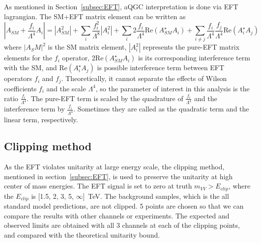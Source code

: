 As mentioned in Section~\ref{subsec:EFT}, aQGC interpretation is done via EFT lagrangian. 
The SM+EFT matrix element can be written as
\begin{equation}
   |A_{SM}+\frac{f_i}{\Lambda^4}A_i|=|A_{SM}^2|+\sum\limits_i \frac{f_i^2}{\Lambda^8}|A_{i}^2|+ \sum\limits_i 2 \frac{f_i}{\Lambda^4} \mathrm{Re}(A_{SM}^\star A_i) +\sum\limits_{i\neq j} \frac{f_i}{\Lambda^4} \frac{f_j}{\Lambda^4} \mathrm{Re}(A_i^\star A_j)
\end{equation}
where $|A_SM|^2$ is the SM matrix element, $|A_{i}^2|$ represents the pure-EFT matrix elements for the $f_{i}$ operator, $2 \mathrm{Re}(A_{SM}^\star A_i)$ is its corresponding interference term with the SM, and $\mathrm{Re}(A_i^\star A_j)$ is possible interference term between EFT operators $f_{i}$ and $f_{j}$. 
Theoretically, it cannot separate the effects of Wilson coefficients $f_i$ and the scale $\Lambda^4$, so the parameter of interest in this analysis is the ratio $\frac{f_i}{\Lambda^4}$. %
The pure-EFT term is scaled by the quadrature of $\frac{f_i}{\Lambda^4}$ and the interference term by $\frac{f_{i}}{\Lambda^4}$.
Sometimes they are called as the quadratic term and the linear term, respectively.

\subsection{Clipping method}
\label{subsec:clipping}
As the EFT violates unitarity at large energy scale, the clipping method, mentioned in section~\ref{subsec:EFT}, is used to preserve the unitarity at high center of mass energies. 
The EFT signal is set to zero at truth $m_{VV} > E_{clip}$, where the $E_{clip}$ is [1.5, 2, 3, 5, $\infty$]~TeV. 
The background samples, which is the all standard model predictions, are not clipped.
5 points are chosen so that we can compare the results with other channels or experiments.
The expected and observed limits are obtained with all 3 channels at each of the clipping points, and compared with the theoretical unitarity bound.


